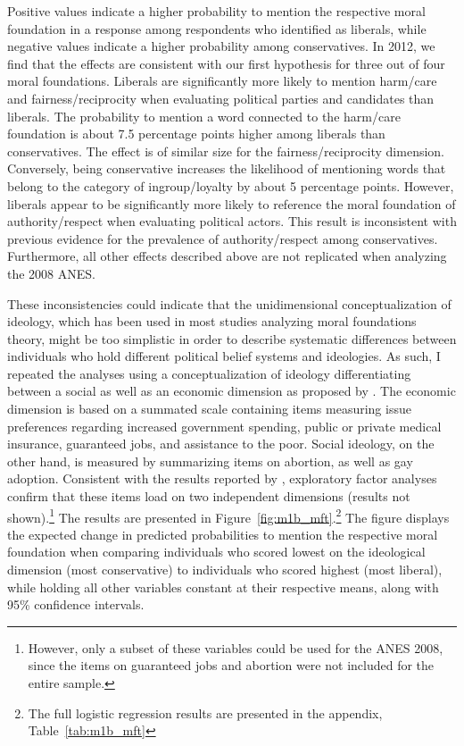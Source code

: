 \documentclass[12pt]{paper}
\begin{document}
Positive values indicate a higher probability to mention the respective moral foundation in a response among respondents who identified as liberals, while negative values indicate a higher probability among conservatives. In 2012, we find that the effects are consistent with our first hypothesis for three out of four moral foundations. Liberals are significantly more likely to mention harm/care and fairness/reciprocity when evaluating political parties and candidates than liberals. The probability to mention a word connected to the harm/care foundation is about 7.5 percentage points higher among liberals than conservatives. The effect is of similar size for the fairness/reciprocity dimension. Conversely, being conservative increases the likelihood of mentioning words that belong to the category of ingroup/loyalty by about 5 percentage points. However, liberals appear to be significantly more likely to reference the moral foundation of authority/respect when evaluating political actors. This result is inconsistent with previous evidence for the prevalence of authority/respect among conservatives. Furthermore, all other effects described above are not replicated when analyzing the 2008 ANES.


These inconsistencies could indicate that the unidimensional conceptualization of ideology, which has been used in most studies analyzing moral foundations theory, might be too simplistic in order to describe systematic differences between individuals who hold different political belief systems and ideologies. As such, I repeated the analyses using a conceptualization of ideology differentiating between a social as well as an economic dimension as proposed by \citet{feldman2013understanding}. The economic dimension is based on a summated scale containing items measuring issue preferences regarding increased government spending, public or private medical insurance, guaranteed jobs, and assistance to the poor. Social ideology, on the other hand, is measured by summarizing items on abortion, as well as gay adoption. Consistent with the results reported by \citet{feldman2013understanding}, exploratory factor analyses confirm that these items load on two independent dimensions (results not shown).\footnote{However, only a subset of these variables could be used for the ANES 2008, since the items on guaranteed jobs and abortion were not included for the entire sample.} The results are presented in Figure~\ref{fig:m1b_mft}.\footnote{The full logistic regression results are presented in the appendix, Table~\ref{tab:m1b_mft}} The figure displays the expected change in predicted probabilities to mention the respective moral foundation when comparing individuals who scored lowest on the ideological dimension (most conservative) to individuals who scored highest (most liberal), while holding all other variables constant at their respective means, along with 95\% confidence intervals.
\end{document}
